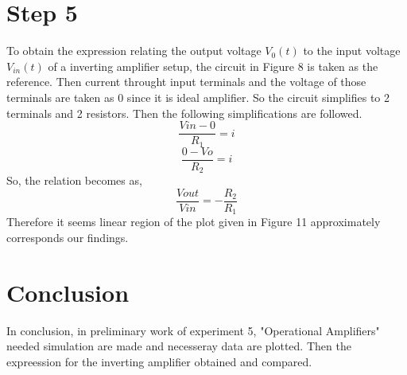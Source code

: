 \documentclass[letterpaper,12pt]{article}
\begin{document}
\section{Step 5}
To obtain the expression relating the output voltage \(V_0 (t)\) to the input voltage \(V_{in} (t)\) of a inverting amplifier setup, the circuit in Figure 8 is taken as the reference. Then current throught input terminals and the voltage of those terminals are taken as 0 since it is ideal amplifier. So the circuit simplifies to 2 terminals and 2 resistors. Then the following simplifications are followed.
\[\frac{V{in} - 0 }{R_1} = i\]
\[\frac{0 - V{o} }{R_2} = i\]
So, the relation becomes as,
\[\frac{V{out}}{V{in}} = -\frac{R_2}{R_1}\]
Therefore it seems linear region of the plot given in Figure 11 approximately corresponds our findings.

\section{Conclusion}
In conclusion, in preliminary work of experiment 5, "Operational Amplifiers"  needed simulation are made and necesseray data are plotted. Then the expreession for the inverting amplifier obtained and compared.



\end{document}
